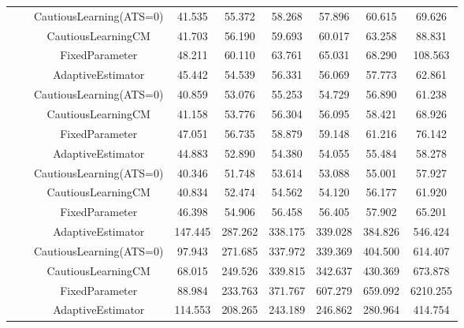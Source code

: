 \begin{table}[!h]
\begin{tabular}[t]{ccccccccc}
 &  & CautiousLearning(ATS=0) & 41.535 & 55.372 & 58.268 & 57.896 & 60.615 & 69.626\\

 &  & CautiousLearningCM & 41.703 & 56.190 & 59.693 & 60.017 & 63.258 & 88.831\\

 & \multirow[t]{-4}{*}{\centering\arraybackslash 1.00} & FixedParameter & 48.211 & 60.110 & 63.761 & 65.031 & 68.290 & 108.563\\
\cmidrule{2-9}
 &  & AdaptiveEstimator & 45.442 & 54.539 & 56.331 & 56.069 & 57.773 & 62.861\\

 &  & CautiousLearning(ATS=0) & 40.859 & 53.076 & 55.253 & 54.729 & 56.890 & 61.238\\

 &  & CautiousLearningCM & 41.158 & 53.776 & 56.304 & 56.095 & 58.421 & 68.926\\

 & \multirow[t]{-4}{*}{\centering\arraybackslash 1.25} & FixedParameter & 47.051 & 56.735 & 58.879 & 59.148 & 61.216 & 76.142\\
\cmidrule{2-9}
 &  & AdaptiveEstimator & 44.883 & 52.890 & 54.380 & 54.055 & 55.484 & 58.278\\

 &  & CautiousLearning(ATS=0) & 40.346 & 51.748 & 53.614 & 53.088 & 55.001 & 57.927\\

 &  & CautiousLearningCM & 40.834 & 52.474 & 54.562 & 54.120 & 56.177 & 61.920\\

\multirow[t]{-28}{*}{\centering\arraybackslash 50} & \multirow[t]{-4}{*}{\centering\arraybackslash 1.50} & FixedParameter & 46.398 & 54.906 & 56.458 & 56.405 & 57.902 & 65.201\\
\cmidrule{1-9}
 &  & AdaptiveEstimator & 147.445 & 287.262 & 338.175 & 339.028 & 384.826 & 546.424\\

 &  & CautiousLearning(ATS=0) & 97.943 & 271.685 & 337.972 & 339.369 & 404.500 & 614.407\\

 &  & CautiousLearningCM & 68.015 & 249.526 & 339.815 & 342.637 & 430.369 & 673.878\\

 & \multirow[t]{-4}{*}{\centering\arraybackslash 0.25} & FixedParameter & 88.984 & 233.763 & 371.767 & 607.279 & 659.092 & 6210.255\\
\cmidrule{2-9}
 &  & AdaptiveEstimator & 114.553 & 208.265 & 243.189 & 246.862 & 280.964 & 414.754\\


\end{tabular}
\end{table}
